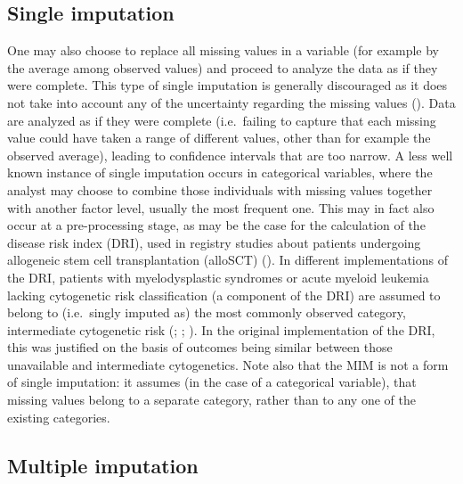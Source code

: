 \documentclass[
  letterpaper,
  paper=240mm:170mm,
  twoside=true,
  open=right,
  fontsize=10pt,
  pagesize=false,
  BCOR=15mm,
  DIV=14,
  headinclude=true,
  footinclude=false,
  headsepline=on]{scrbook}
\begin{document}
\subsection{Single imputation}\label{single-imputation}

One may also choose to replace all missing values in a variable (for
example by the average among observed values) and proceed to analyze the
data as if they were complete. This type of single imputation is
generally discouraged as it does not take into account any of the
uncertainty regarding the missing values
(). Data are analyzed as if they were complete (i.e.~failing
to capture that each missing value could have taken a range of different
values, other than for example the observed average), leading to
confidence intervals that are too narrow. A less well known instance of
single imputation occurs in categorical variables, where the analyst may
choose to combine those individuals with missing values together with
another factor level, usually the most frequent one. This may in fact
also occur at a pre-processing stage, as may be the case for the
calculation of the disease risk index (DRI), used in registry studies
about patients undergoing allogeneic stem cell transplantation (alloSCT)
(). In different implementations of the DRI, patients with
myelodysplastic syndromes or acute myeloid leukemia lacking cytogenetic
risk classification (a component of the DRI) are assumed to belong to
(i.e.~singly imputed as) the most commonly observed category,
intermediate cytogenetic risk
(;
;
). In the original implementation of the DRI, this was
justified on the basis of outcomes being similar between those
unavailable and intermediate cytogenetics. Note also that the MIM is not
a form of single imputation: it assumes (in the case of a categorical
variable), that missing values belong to a separate category, rather
than to any one of the existing categories.

\subsection{Multiple imputation}\label{multiple-imputation-1}
\end{document}
